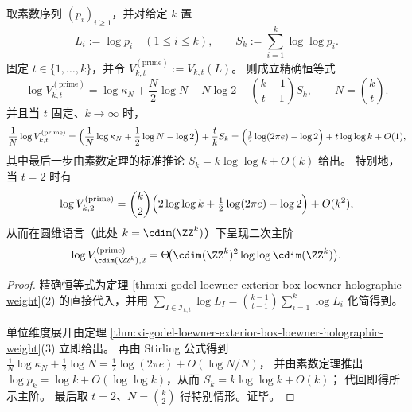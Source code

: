 \begin{theorem}\label{thm:xi-godel-prime-register-exterior-volume-quadratic-law}
取素数序列 \((p_i)_{i\ge 1}\)，并对给定 \(k\) 置
\[
L_i:=\log p_i\quad(1\le i\le k),
\qquad
S_k:=\sum_{i=1}^{k}\log\log p_i.
\]
固定 \(t\in\{1,\dots,k\}\)，并令 \(V^{(\mathrm{prime})}_{k,t}:=V_{k,t}(L)\)。
则成立精确恒等式
\[
\log V^{(\mathrm{prime})}_{k,t}
=
\log\kappa_N+\frac{N}{2}\log N-N\log 2+\binom{k-1}{t-1}S_k,
\qquad N=\binom{k}{t}.
\]
并且当 \(t\) 固定、\(k\to\infty\) 时，
\[
\frac{1}{N}\log V^{(\mathrm{prime})}_{k,t}
=
\Bigl(\frac{1}{N}\log\kappa_N+\frac12\log N-\log 2\Bigr)+\frac{t}{k}S_k
=
\Bigl(\tfrac12\log(2\pi e)-\log 2\Bigr)+t\log\log k+O(1),
\]
其中最后一步由素数定理的标准推论 \(S_k=k\log\log k+O(k)\) 给出。
特别地，当 \(t=2\) 时有
\[
\log V^{(\mathrm{prime})}_{k,2}
=
\binom{k}{2}\Bigl(2\log\log k+\tfrac12\log(2\pi e)-\log 2\Bigr)+O(k^2),
\]
从而在圆维语言（此处 \(k=\cdim(\ZZ^k)\)）下呈现二次主阶
\[
\log V^{(\mathrm{prime})}_{\cdim(\ZZ^k),2}
=
\Theta\!\big(\cdim(\ZZ^k)^2\log\log \cdim(\ZZ^k)\big).
\]
\end{theorem}
\begin{proof}
精确恒等式为定理 \ref{thm:xi-godel-loewner-exterior-box-loewner-holographic-weight}(2) 的直接代入，并用
\(
\sum_{I\in\mathcal I_{k,t}}\log L_I=\binom{k-1}{t-1}\sum_{i=1}^k\log L_i
\)
化简得到。
\par
单位维度展开由定理 \ref{thm:xi-godel-loewner-exterior-box-loewner-holographic-weight}(3) 立即给出。
再由 Stirling 公式得到
\(
\frac1N\log\kappa_N+\frac12\log N=\frac12\log(2\pi e)+O(\log N/N)
\)，
并由素数定理推出 \(\log p_k=\log k+O(\log\log k)\)，从而
\(
S_k=k\log\log k+O(k)
\)；
代回即得所示主阶。
最后取 \(t=2\)、\(N=\binom{k}{2}\) 得特别情形。证毕。
\end{proof}

\endinput

